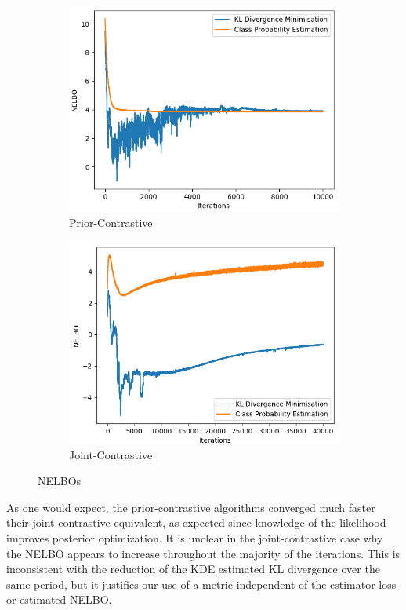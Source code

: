 \documentclass[honours,12pt]{unswthesis}
\numberwithin{equation}{section}
\theoremstyle{definition}
\begin{document}
\begin{figure}[h!]
\begin{subfigure}{0.49\textwidth}
\includegraphics[width=\linewidth]{nelbos/PCKLvsPCADV.png}
\caption{Prior-Contrastive}
\end{subfigure}
\begin{subfigure}{0.49\textwidth}
\includegraphics[width=\linewidth]{nelbos/JCKLvsJCADV.png}
\caption{Joint-Contrastive}
\end{subfigure}
\caption{NELBOs}
\end{figure}
\newpage
As one would expect, the prior-contrastive algorithms converged much faster their joint-contrastive equivalent, as expected since knowledge of the likelihood improves posterior optimization. It is unclear in the joint-contrastive case why the NELBO appears to increase throughout the majority of the iterations. This is inconsistent with the reduction of the KDE estimated KL divergence over the same period, but it justifies our use of a metric independent of the estimator loss or estimated NELBO.
\end{document}
